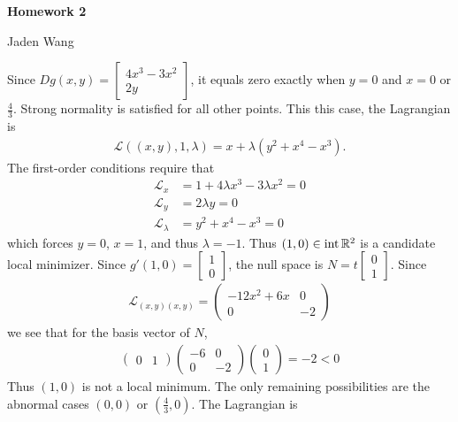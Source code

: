 \documentclass[12pt]{article}
\begin{document}
\centerline {\textsf{\textbf{\LARGE{Homework 2}}}}
\centerline {Jaden Wang}
\vspace{.15in}

\begin{problem}[1]
Since $ Dg(x,y) = \begin{bmatrix} 4x^3-3x^2\\2y \end{bmatrix}$, it equals zero exactly when $ y=0$ and  $ x=0$ or  $ \frac{4}{3}$. Strong normality is satisfied for all other points. This this case, the Lagrangian is
\begin{align*}
	\mathscr{L}((x,y),1,\lambda) = x + \lambda(y^2+x^{4} - x^3) .
\end{align*}
The first-order conditions require that
\begin{align*}
	\mathscr{L}_x &= 1+4\lambda x^3-3\lambda x^2 =0\\
	\mathscr{L}_y &= 2\lambda y =0\\
	\mathscr{L}_\lambda &= y^2+x^{4}-x^3=0 
\end{align*}
which forces $ y=0$,  $ x=1$, and thus  $ \lambda = -1$. Thus $ (1,0) \in \operatorname{int} \mathbb{R}^2$ is a candidate local minimizer.  Since $ g'(1,0) = \begin{bmatrix} 1\\0 \end{bmatrix} $, the null space is $ N = t \begin{bmatrix} 0\\1 \end{bmatrix} $. Since 
\begin{align*}
	\mathscr{L}_{(x,y) (x,y)} = \begin{pmatrix} -12x^2+6x & 0\\0& -2 \end{pmatrix} 
\end{align*}
we see that for the basis vector of  $ N$,
\begin{align*}
	\begin{pmatrix} 0&1 \end{pmatrix} \begin{pmatrix} -6&0\\0&-2 \end{pmatrix} \begin{pmatrix} 0\\1 \end{pmatrix} = -2 <0 
\end{align*}
Thus $ (1,0)$ is not a local minimum. The only remaining possibilities are the abnormal cases $ (0,0)$ or $ (\frac{4}{3},0)$. The Lagrangian is

\end{problem}
\end{document}
